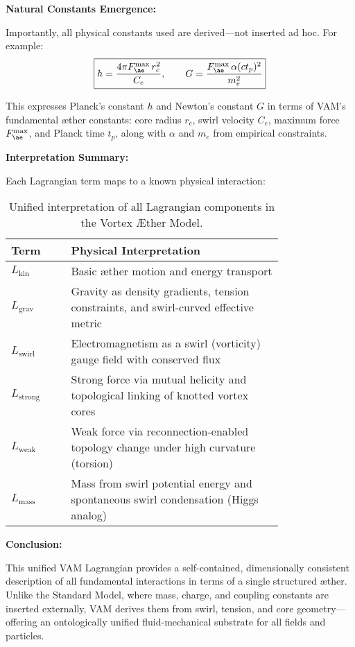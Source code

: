 \vspace{1em}
\noindent
\textbf{Natural Constants Emergence:}

Importantly, all physical constants used are derived—not inserted ad hoc. For example:
\[
\boxed{
h = \frac{4\pi F^{\max}_{\ae} \, r_c^2}{C_e}, \qquad
G = \frac{F^{\max}_{\ae} \, \alpha (ct_p)^2}{m_e^2}
}
\]

This expresses Planck’s constant \( h \) and Newton’s constant \( G \) in terms of VAM’s fundamental æther constants: core radius \( r_c \), swirl velocity \( C_e \), maximum force \( F^{\max}_{\ae} \), and Planck time \( t_p \), along with \( \alpha \) and \( m_e \) from empirical constraints.

\vspace{1em}
\noindent
\textbf{Interpretation Summary:}

Each Lagrangian term maps to a known physical interaction:

\begin{table}[H]
\centering
\renewcommand{\arraystretch}{1.2}
\begin{tabular}{|l|p{0.78\linewidth}|}
\hline
\textbf{Term} & \textbf{Physical Interpretation} \\
\hline
\( L_{\text{kin}} \) & Basic æther motion and energy transport \\
\( L_{\text{grav}} \) & Gravity as density gradients, tension constraints, and swirl-curved effective metric \\
\( L_{\text{swirl}} \) & Electromagnetism as a swirl (vorticity) gauge field with conserved flux \\
\( L_{\text{strong}} \) & Strong force via mutual helicity and topological linking of knotted vortex cores \\
\( L_{\text{weak}} \) & Weak force via reconnection-enabled topology change under high curvature (torsion) \\
\( L_{\text{mass}} \) & Mass from swirl potential energy and spontaneous swirl condensation (Higgs analog) \\
\hline
\end{tabular}
\caption{Unified interpretation of all Lagrangian components in the Vortex Æther Model.}
\end{table}

\vspace{1em}
\noindent
\textbf{Conclusion:}

This unified VAM Lagrangian provides a self-contained, dimensionally consistent description of all fundamental interactions in terms of a single structured æther. Unlike the Standard Model, where mass, charge, and coupling constants are inserted externally, VAM derives them from swirl, tension, and core geometry—offering an ontologically unified fluid-mechanical substrate for all fields and particles.